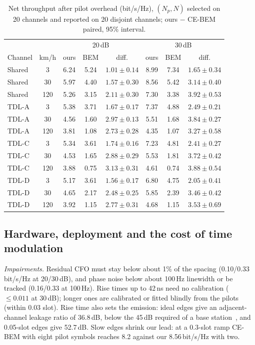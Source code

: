 \documentclass[conference,10pt]{IEEEtran}
\theoremstyle{remark}
\begin{document}
\begin{table}[t]\centering\footnotesize
\caption{Net throughput after pilot overhead (bit/s/Hz), $(N_p,N)$ selected on 20 channels and reported on 20 disjoint channels; ours $-$ CE-BEM paired, 95\% interval.}\label{tab:overhead}
\setlength{\tabcolsep}{2.2pt}
\begin{tabular}{@{}lccccccc@{}}\toprule
 & & \multicolumn{3}{c}{20\,dB} & \multicolumn{3}{c}{30\,dB}\\
Channel & km/h & ours & BEM & diff. & ours & BEM & diff.\\\midrule
Shared & 3 & 6.24 & 5.24 & $1.01\pm0.14$ & 8.99 & 7.34 & $1.65\pm0.34$\\
Shared & 30 & 5.97 & 4.40 & $1.57\pm0.30$ & 8.56 & 5.42 & $3.14\pm0.40$\\
Shared & 120 & 5.26 & 3.15 & $2.11\pm0.30$ & 7.30 & 3.38 & $3.92\pm0.53$\\
\midrule
TDL-A & 3 & 5.38 & 3.71 & $1.67\pm0.17$ & 7.37 & 4.88 & $2.49\pm0.21$\\
TDL-A & 30 & 4.56 & 1.60 & $2.97\pm0.13$ & 5.51 & 1.68 & $3.84\pm0.27$\\
TDL-A & 120 & 3.81 & 1.08 & $2.73\pm0.28$ & 4.35 & 1.07 & $3.27\pm0.58$\\
\midrule
TDL-C & 3 & 5.34 & 3.61 & $1.74\pm0.16$ & 7.23 & 4.81 & $2.41\pm0.27$\\
TDL-C & 30 & 4.53 & 1.65 & $2.88\pm0.29$ & 5.53 & 1.81 & $3.72\pm0.42$\\
TDL-C & 120 & 3.88 & 0.75 & $3.13\pm0.31$ & 4.61 & 0.74 & $3.88\pm0.54$\\
\midrule
TDL-D & 3 & 5.17 & 3.61 & $1.56\pm0.17$ & 6.80 & 4.75 & $2.05\pm0.41$\\
TDL-D & 30 & 4.65 & 2.17 & $2.48\pm0.25$ & 5.85 & 2.39 & $3.46\pm0.42$\\
TDL-D & 120 & 3.92 & 1.15 & $2.77\pm0.31$ & 4.68 & 1.15 & $3.53\pm0.69$\\
\bottomrule
\end{tabular}
\end{table}

\subsection{Hardware, deployment and the cost of time modulation}\label{sec:res-hw}
\emph{Impairments.} Residual CFO must stay below about 1\% of the spacing (0.10/0.33\,bit/s/Hz at 20/30\,dB), and
phase noise below about 100\,Hz linewidth or be tracked (0.16/0.33 at 100\,Hz). Rise times up to 42\,ns need no
calibration ($\le0.011$ at 30\,dB); longer ones are calibrated or fitted blindly from the pilots (within 0.03 slot).
Rise time also sets the emission: ideal edges give an adjacent-channel leakage ratio of 36.8\,dB, below the 45\,dB
required of a base station~\cite{ts38104}, and 0.05-slot edges give 52.7\,dB. Slow edges shrink our lead: at a 0.3-slot
ramp CE-BEM with eight pilot symbols reaches 8.2 against our 8.56\,bit/s/Hz with two.
\end{document}
